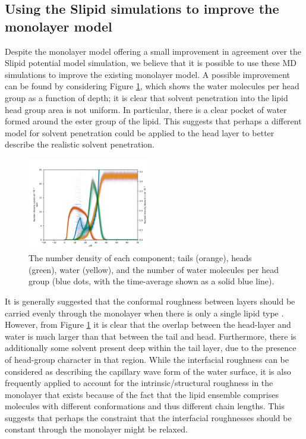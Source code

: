 \documentclass[amsmath,amssymb,twocolumn,superscriptaddress]{revtex4-1}
\begin{document}
\subsection{Using the Slipid simulations to improve the monolayer model}
Despite the monolayer model offering a small improvement in agreement over
the Slipid potential model simulation, we believe that it is possible to use
these MD simulations to improve the existing monolayer model.
A possible improvement can be found by considering Figure \ref{fig:nb},
which shows the water molecules per head group as a function
of depth; it is clear that solvent penetration into the lipid head group
area is not uniform.
In particular, there is a clear pocket of water formed around the ester
group of the lipid.
This suggests that perhaps a different model for solvent penetration could
be applied to the head layer to better describe the realistic solvent
penetration.
%
\begin{figure}
\centering
  \includegraphics[width=0.48\textwidth]{number_density}
  \caption{The number density of each component; tails (orange), heads
  (green), water (yellow), and the number of water molecules per head
  group (blue dots, with the time-average shown as a solid blue line).}
  \label{fig:nb}
\end{figure}
%

It is generally suggested that the conformal roughness between layers
should be carried evenly through the monolayer when there is only a single
lipid type \cite{campbell_structure_2018}.
However, from Figure \ref{fig:nb} it is clear that the overlap between the
head-layer and water is much larger than that between the tail and head.
Furthermore, there is additionally some solvent present deep within the tail
layer, due to the presence of head-group character in that region.
While the interfacial roughness can be considered as describing the capillary
wave form of the water surface, it is also frequently applied to account
for the intrinsic/structural roughness in the monolayer that exists because
of the fact that the lipid ensemble comprises molecules with different
conformations and thus different chain lengths.
This suggests that perhaps the constraint that the interfacial roughnesses
should be constant through the monolayer might be relaxed.
\end{document}
